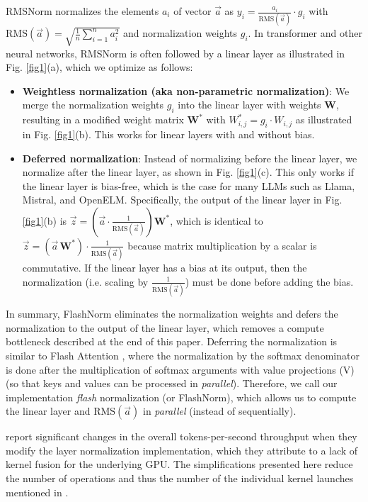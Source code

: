 \documentclass{article}
\newcommand{\mat}[1]{\mathbf{#1}}     %
\def\rms{\text{RMS}(\vec{a})}         %
\def\f1n{\frac{1}{n}}                 %
\def\sas{\sum_{i=1}^n a_i^2}          %
\def\W*{\mat{W}^\ast}                 %
\def\a{\vec{a}}                       %
\def\vz{\vec{z}}                      %
\begin{document}
RMSNorm \citep{rms} normalizes the elements  $a_i$ of vector $\a$ as $y_i = \frac{a_i}{\rms} \cdot g_i$ with $\rms = \sqrt{\f1n \sas}$ and normalization weights $g_i$. In transformer \citep{vanilla} and other neural networks, RMSNorm is often followed by a linear layer as illustrated in Fig. \ref{fig1}(a), which we optimize as follows:
\begin{itemize}[topsep=-1pt, itemsep=-1pt]
  \item \textbf{Weightless normalization (aka non-parametric normalization)}: We merge the normalization weights $g_i$ into the linear layer with weights $\mat{W}$, resulting in a modified weight matrix $\W*$ with $W_{i,j}^\ast = g_i \cdot W_{i,j}$ as illustrated in Fig. \ref{fig1}(b). This works for linear layers with and without bias.
  \item \textbf{Deferred normalization}: Instead of normalizing before the linear layer, we normalize after the linear layer, as shown in Fig. \ref{fig1}(c). This only works if the linear layer is bias-free, which is the case for many LLMs such as Llama, Mistral, and OpenELM. Specifically, the output of the linear layer in Fig. \ref{fig1}(b) is $\vz = \left( \a \cdot \frac{1}{\rms} \right) \W*$, which is identical to $\vz = \left( \a \, \W* \right) \cdot \frac{1}{\rms}$ because matrix multiplication by a scalar is commutative. If the linear layer has a bias at its output, then the normalization (i.e. scaling by $\frac{1}{\rms}$) must be done before adding the bias.
\end{itemize}

In summary, FlashNorm eliminates the normalization weights and defers the normalization to the output of the linear layer, which removes a compute bottleneck described at the end of this paper. Deferring the normalization is similar to Flash Attention \citep{flash-attention}, where the normalization by the softmax denominator is done after the multiplication of softmax arguments with value projections (V) (so that keys and values can be processed in \emph{parallel}). Therefore, we call our implementation \emph{flash} normalization (or FlashNorm), which allows us to compute the linear layer and $\rms$ in \emph{parallel} (instead of sequentially).

\citeauthor{openelm} report significant changes in the overall tokens-per-second throughput when they modify the layer normalization implementation, which they attribute to a lack of kernel fusion for the underlying GPU. The simplifications presented here reduce the number of operations and thus the number of the individual kernel launches mentioned in \citep{openelm}.
\end{document}

